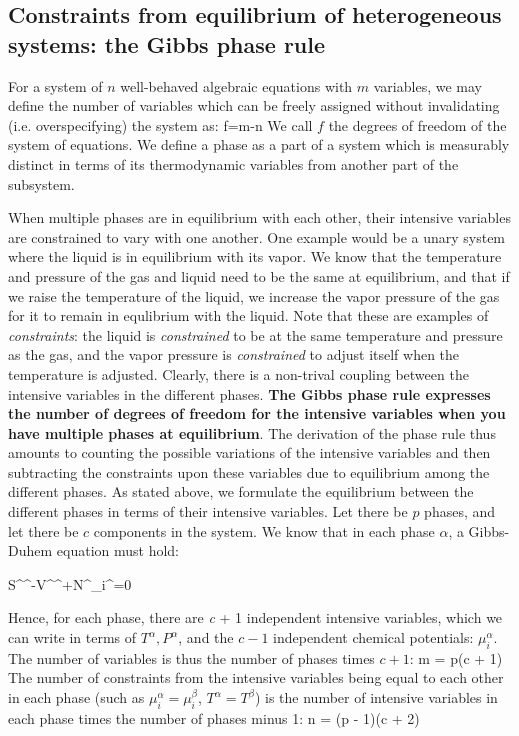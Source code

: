 \documentclass[12pt]{article}
\begin{document}
\subsection{Constraints from equilibrium of heterogeneous systems: the Gibbs phase rule} \label{phaseRule}
For a system of $n$ well-behaved algebraic equations with $m$ variables, we may define the number of variables which can be freely assigned without invalidating (i.e. overspecifying) the system as:
\eqs f=m-n \eqe
We call $f$ the degrees of freedom of the system of equations. We define a phase as a part of a system which is measurably distinct in terms of its thermodynamic variables from another part of the subsystem.

When multiple phases are in equilibrium with each other, their intensive variables are constrained to vary with one another. One example would be a unary system where the liquid is in equilibrium with its vapor. We know that the temperature and pressure of the gas and liquid need to be the same at equilibrium, and that if we raise the temperature of the liquid, we increase the vapor pressure of the gas for it to remain in equlibrium with the liquid. Note that these are examples of \emph{constraints}: the liquid is \emph{constrained} to be at the same temperature and pressure as the gas, and the vapor pressure is \emph{constrained} to adjust itself when the temperature is adjusted. Clearly, there is a non-trival coupling between the intensive variables in the different phases. \textbf{The Gibbs phase rule expresses the number of degrees of freedom for the intensive variables when you have multiple phases at equilibrium}. The derivation of the phase rule thus amounts to counting the possible variations of the intensive variables and then subtracting the constraints upon these variables due to equilibrium among the different phases.
As stated above, we formulate the equilibrium between the different phases in terms of their intensive variables. Let there be $p$ phases, and let there be $c$ components in the system. We know that in each phase $\alpha$, a Gibbs-Duhem equation must hold:

\eqs
S^{\alpha }^{\alpha }-V^{\alpha }^{\alpha }+N^{\alpha }_i^{\alpha }=0\eqe

Hence, for each phase, there are \textit{ c} + 1 independent intensive variables, which we can write in terms of $T^{\alpha },P^{\alpha }$, and the $c-1$ independent chemical potentials: $\mu _i^{\alpha}$. The number of variables is thus the number of phases times $c + 1$: 
\eqs m = p(c + 1) \eqe
The number of constraints from the intensive variables being equal to each other in each phase (such as $\mu_i^\alpha = \mu_i^\beta$, $T^\alpha=T^\beta$) is the number of intensive variables in each phase
times the number of phases minus 1:
\eqs n = (p - 1)(c + 2) \eqe
\end{document}
